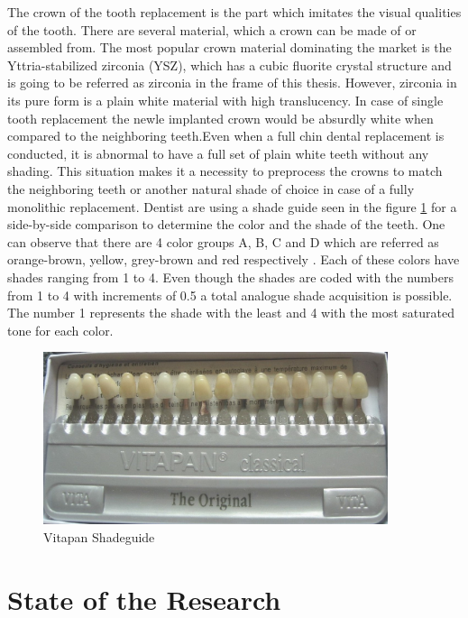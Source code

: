  The crown of the tooth replacement is the part which imitates the visual qualities of the tooth. There are several material, which a crown can be made of or assembled from. The most popular crown material dominating the market is the Yttria-stabilized zirconia (YSZ), which has a cubic fluorite crystal structure and is going to be referred as zirconia in the frame of this thesis. However, zirconia in its pure form is a plain white material with high translucency. In case of single tooth replacement  the newle implanted crown would be absurdly white when compared to the neighboring teeth.Even when a full chin dental replacement is conducted, it is abnormal to have a full set of plain white teeth without any shading. This situation makes it a necessity to preprocess the crowns to match the neighboring teeth or another natural shade of choice in case of a fully monolithic replacement. Dentist are using a shade guide seen in the figure \ref{fig:shadeguide} for a side-by-side comparison to determine the color and the shade of the teeth. One can observe that there are 4 color groups A, B, C and D which are referred as orange-brown, yellow, grey-brown and red respectively \citep{vita}. Each of these colors have shades ranging from 1 to 4. Even though the shades are coded with the numbers from 1 to 4 with increments of 0.5 a total analogue shade acquisition is possible. The number 1 represents the shade with the least and 4 with the most saturated tone for each color.
 \newline
 \begin{figure}[h]
 	\centering
 	\includegraphics[width=0.9\textwidth]{grafiken/shadeguide.jpg}
 	\caption{Vitapan Shadeguide}
 	\label{fig:shadeguide}
 \end{figure}  
 


\chapter{State of the Research}
\label{sec:stand_forschung}


